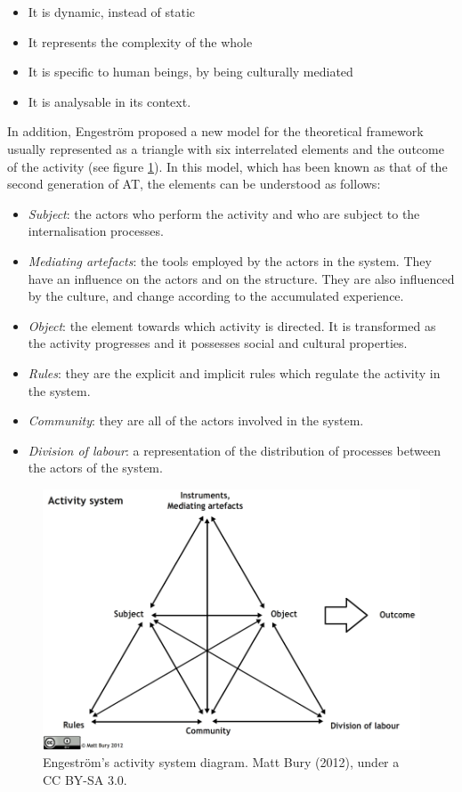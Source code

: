 \begin{itemize}
	\item It is dynamic, instead of static
	\item It represents the complexity of the whole
	\item It is specific to human beings, by being culturally mediated
	\item It is analysable in its context.
\end{itemize}

In addition, Engestr{\"o}m proposed a new model for the theoretical framework usually represented as a triangle with six interrelated elements and the outcome of the activity (see figure \ref{engestrom-diagram-sec-gen}). In this model, which has been known as that of the second generation of AT, the elements can be understood as follows:

\begin{itemize}
	\item \textit{Subject}: the actors who perform the activity and who are subject to the internalisation processes.
	\item \textit{Mediating artefacts}: the tools employed by the actors in the system. They have an influence on the actors and on the structure. They are also influenced by the culture, and change according to the accumulated experience.
	\item \textit{Object}: the element towards which activity is directed. It is transformed as the activity progresses and it possesses social and cultural properties.
	\item \textit{Rules}: they are the explicit and implicit rules which regulate the activity in the system.
	\item \textit{Community}: they are all of the actors involved in the system.
	\item \textit{Division of labour}: a representation of the distribution of processes between the actors of the system.
\end{itemize}

\begin{figure}[H]
	\centering
	\includegraphics[scale=0.3]{img/engestrom_diagram.png}
	\caption[Engestr{\"o}m's activity system diagram]%
	{Engestr{\"o}m's activity system diagram. Matt Bury (2012), under a CC BY-SA 3.0.}
	\label{engestrom-diagram-sec-gen}
\end{figure}

